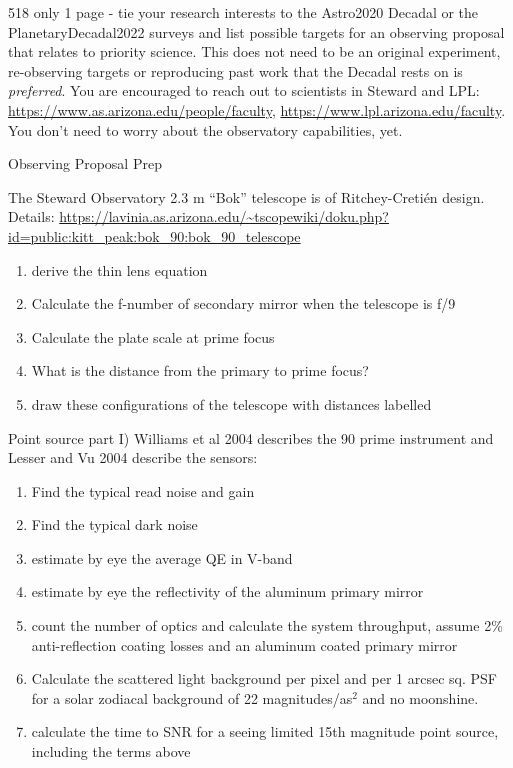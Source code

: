

\begin{frame}{518 only}
    1 page - tie your research interests to the Astro2020 Decadal or the PlanetaryDecadal2022 surveys and list possible targets for an observing proposal that relates to priority science. 
    This does not need to be an original experiment, re-observing targets or reproducing past work that the Decadal rests on is \textit{preferred}.
    You are encouraged to reach out to scientists in Steward and LPL: \url{https://www.as.arizona.edu/people/faculty}, \url{https://www.lpl.arizona.edu/faculty}.
    You don't need to worry about the observatory capabilities, yet.
\end{frame}
\begin{frame}{Observing Proposal Prep}
    
The Steward Observatory 2.3 m ``Bok'' telescope is of Ritchey-Cretién design.%
 Details: \url{https://lavinia.as.arizona.edu/~tscopewiki/doku.php?id=public:kitt_peak:bok_90:bok_90_telescope}
 
 \begin{enumerate}
 \item derive the thin lens equation
\item Calculate the f-number of secondary mirror when the telescope is f/9
\item Calculate the plate scale at prime focus
\item What is the distance from the primary to prime focus?
\item draw these configurations of the telescope with distances labelled
\end{enumerate}
\end{frame}

\begin{frame}{Point source part I)}
Williams et al 2004 describes the 90 prime instrument and Lesser and Vu 2004 describe the sensors:
\begin{enumerate}
    \item Find the typical read noise and gain
    \item Find the typical dark noise
    \item  estimate by eye the average QE in V-band
    \item estimate by eye the reflectivity of the aluminum primary mirror
    \item count the number of optics and calculate the system throughput, assume 2\% anti-reflection coating losses and an aluminum coated primary mirror
    \item Calculate the scattered light background per pixel and per 1 arcsec sq. PSF for a solar zodiacal background of 22 magnitudes/as$^2$ and no moonshine. 
    \item calculate the time to SNR for a seeing limited 15th magnitude point source, including the terms above
\end{enumerate}
    
\end{frame}

